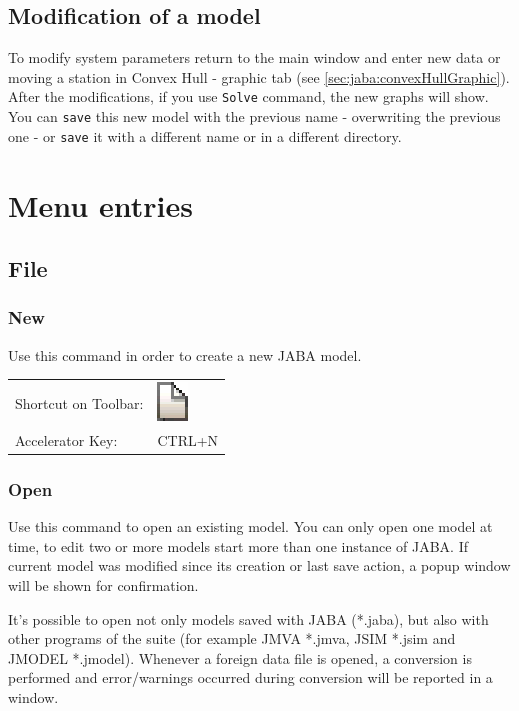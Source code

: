 \subsection{Modification of a model}
To modify system parameters return to the main window and enter new
data or moving a station in Convex Hull - graphic tab (see \autoref{sec:jaba:convexHullGraphic}). 
After the modifications, if you use \texttt{Solve} command, the
new graphs will show. You can \texttt{save} this
new model with the previous name - overwriting the previous one - or
\texttt{save} it with a different name or in a different directory.

\section{Menu entries}
\label{sec:jaba:Menu}
\subsection{File}
\subsubsection{New}
Use this command in order to create a new JABA model.

\noindent
\begin{tabular}{ll}
Shortcut on Toolbar: & \includegraphics[scale=.8]{img/jaba/new}\\
Accelerator Key: & CTRL+N
\end{tabular}

\subsubsection{Open}
Use this command to open an existing model. You can only open one
model at time, to edit two or more models start more than one
instance of JABA. If current model was modified since its creation
or last save action, a popup window will be shown for confirmation.

It's possible to open not only models saved with JABA (*.jaba), but
also with other programs of the suite (for example JMVA *.jmva, JSIM
*.jsim and JMODEL *.jmodel). Whenever a foreign data file is opened, a
conversion is performed and error/warnings occurred during
conversion will be reported in a window.

